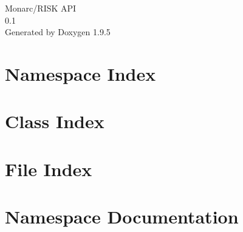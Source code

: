 \documentclass[twoside]{book}
\newcommand{\+}{\discretionary{\mbox{\scriptsize$\hookleftarrow$}}{}{}}
\newcommand{\clearemptydoublepage}{%
    \newpage{\pagestyle{empty}\cleardoublepage}%
  }
\begin{document}
  \raggedbottom
    \hypersetup{pageanchor=false,
                bookmarksnumbered=true,
                pdfencoding=unicode
               }
  \begin{titlepage}
  \vspace*{7cm}
  \begin{center}%
  {\Large Monarc/\+RISK API}\\
  [1ex]\large 0.\+1 \\
  \vspace*{1cm}
  {\large Generated by Doxygen 1.9.5}\\
  \end{center}
  \end{titlepage}
  \clearemptydoublepage
  \tableofcontents
  \clearemptydoublepage
  \hypersetup{pageanchor=true}
\chapter{Namespace Index}

\chapter{Class Index}

\chapter{File Index}

\chapter{Namespace Documentation}

\end{document}
